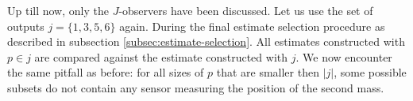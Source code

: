 Up till now, only the $J$-observers have been discussed. Let us use the set of outputs $j=\{1,3,5,6\}$ again. During the final estimate selection procedure as described in subsection \ref{subsec:estimate-selection}. All estimates constructed with $p \in j$ are compared against the estimate constructed with $j$. We now encounter the same pitfall as before: for all sizes of $p$ that are smaller then $|j|$, some possible subsets do not contain any sensor measuring the position of the second mass.